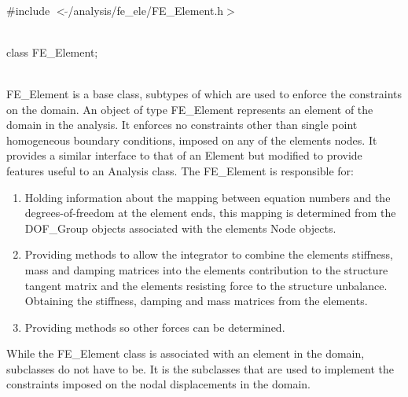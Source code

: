 
   \\
\#include $<\tilde{ }$/analysis/fe\_ele/FE\_Element.h$>$  


  \\
class FE\_Element;  


  \\
\indent FE\_Element is a base class, subtypes of which are used to
enforce the constraints on the domain. An object of type FE\_Element
represents an element of the domain in the analysis. It enforces no
constraints other than single point homogeneous boundary conditions,
imposed on any of the elements nodes. It provides a similar interface
to that of an Element but modified to provide features useful to an
Analysis class.  The FE\_Element is responsible for: \begin{enumerate}
\item Holding information about the mapping between equation numbers
and the degrees-of-freedom at the 
element ends, this mapping is determined from the DOF\_Group objects
associated with the elements Node objects. \item Providing methods to
allow the integrator to combine the elements stiffness, mass and
damping matrices into the elements contribution to the structure
tangent matrix and the elements resisting force to the structure
unbalance. Obtaining the stiffness, damping and mass matrices from the
elements. \item Providing methods so other forces can be
determined. \end{enumerate} While the FE\_Element class is
associated with an element in the domain, subclasses do not have to
be. It is the subclasses that are used to implement the constraints
imposed on the nodal displacements in the domain. \\

